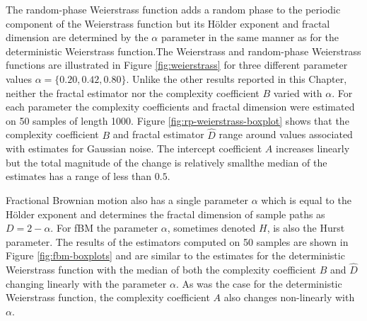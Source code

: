 The random-phase Weierstrass function adds a random 
phase to the periodic component of the Weierstrass function 
but its H\"older exponent and fractal dimension are 
determined by the $\alpha$ parameter
in the same manner as for the deterministic 
Weierstrass function.The Weierstrass and 
random-phase Weierstrass functions are
 illustrated in Figure \ref{fig:weierstrass} 
for three different parameter values $
\alpha = \{ 0.20, 0.42, 0.80 \}$. Unlike the other 
results reported in this Chapter, neither the 
fractal estimator nor the complexity coefficient 
$B$ varied with $\alpha$. For each parameter the complexity coefficients 
and fractal dimension were estimated on 50 
samples of length 1000. Figure 
\ref{fig:rp-weierstrass-boxplot} shows that the 
complexity coefficient $B$ and
fractal estimator $\hat D$ range around values 
associated with estimates for Gaussian noise.
The intercept coefficient $A$ increases 
linearly but the total magnitude of the change is 
relatively small\textemdash the median of the estimates has a range 
of less than $0.5$. 


Fractional Brownian motion also has 
a single parameter $\alpha$ which is equal to
 the H\"older exponent and determines the fractal dimension of
sample paths as $D = 2 - \alpha$. For fBM the 
parameter $\alpha$, sometimes denoted $H$, is also 
the Hurst parameter. The results 
of the estimators computed on 50 samples are shown 
in Figure \ref{fig:fbm-boxplots} and are similar 
to the estimates for the deterministic Weierstrass 
function with the median of both the complexity
coefficient $B$ and $\hat D$ changing linearly
with the parameter $\alpha$. As was
the case for the deterministic Weierstrass 
function, the complexity 
coefficient $A$ also changes non-linearly with 
$\alpha$.






